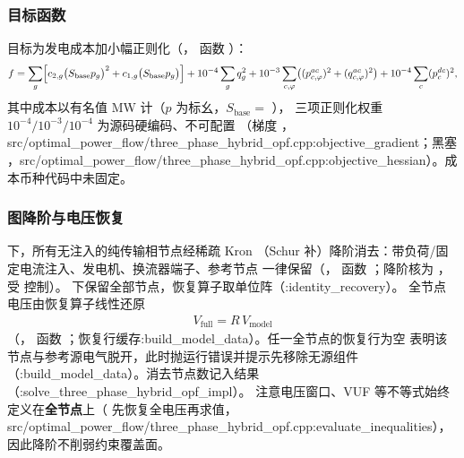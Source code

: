 \subsubsection*{目标函数}
目标为发电成本加小幅正则化（，
函数 ）：
\begin{align*}
f = \sum_{g}\Bigl[c_{2,g}\bigl(S_{\mathrm{base}}p_g\bigr)^{2}
  + c_{1,g}\bigl(S_{\mathrm{base}}p_g\bigr)\Bigr]
  + 10^{-4}\sum_{g} q_g^{2}
  + 10^{-3}\sum_{c,\varphi}\bigl((p^{ac}_{c,\varphi})^{2}+(q^{ac}_{c,\varphi})^{2}\bigr)
  + 10^{-4}\sum_{c} (p^{dc}_c)^{2},
\end{align*}
其中成本以有名值 MW 计（$p$ 为标幺，$S_{\mathrm{base}}=$ ），
三项正则化权重 $10^{-4}/10^{-3}/10^{-4}$ 为源码硬编码、不可配置
（梯度 ，src/optimal\_power\_flow/three\_phase\_hybrid\_opf.cpp:objective\_gradient；黑塞
，src/optimal\_power\_flow/three\_phase\_hybrid\_opf.cpp:objective\_hessian）。成本币种代码中未固定。

\subsubsection*{图降阶与电压恢复}
 下，所有无注入的纯传输相节点经稀疏 Kron
（Schur 补）降阶消去：带负荷/固定电流注入、发电机、换流器端子、参考节点
一律保留（，
函数 ；降阶核为
，受  控制）。
 下保留全部节点，恢复算子取单位阵（:identity\_recovery）。
全节点电压由恢复算子线性还原
\begin{align*}
V_{\mathrm{full}} = R\,V_{\mathrm{model}}
\end{align*}
（，
函数 ；恢复行缓存:build\_model\_data）。任一全节点的恢复行为空
表明该节点与参考源电气脱开，此时抛运行错误并提示先移除无源组件
（:build\_model\_data）。消去节点数记入结果 （:solve\_three\_phase\_hybrid\_opf\_impl）。
注意电压窗口、VUF 等不等式始终定义在\textbf{全节点}上（
 先恢复全电压再求值，src/optimal\_power\_flow/three\_phase\_hybrid\_opf.cpp:evaluate\_inequalities），
因此降阶不削弱约束覆盖面。


